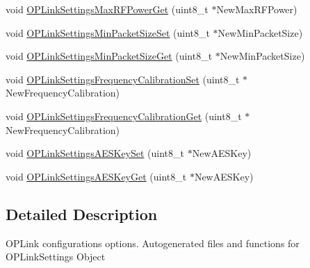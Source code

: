 \begin{DoxyCompactItemize}
\item 
void \hyperlink{group___o_p_link_settings_ga871cbb3c111d2d9a970a85e9e14ec7a9}{\-O\-P\-Link\-Settings\-Max\-R\-F\-Power\-Get} (uint8\-\_\-t $\ast$\-New\-Max\-R\-F\-Power)
\item 
void \hyperlink{group___o_p_link_settings_gafdf971b53771b6a2d7e8a5648ed29b06}{\-O\-P\-Link\-Settings\-Min\-Packet\-Size\-Set} (uint8\-\_\-t $\ast$\-New\-Min\-Packet\-Size)
\item 
void \hyperlink{group___o_p_link_settings_ga1ed89784471fb7d19d16321a8d79c16d}{\-O\-P\-Link\-Settings\-Min\-Packet\-Size\-Get} (uint8\-\_\-t $\ast$\-New\-Min\-Packet\-Size)
\item 
void \hyperlink{group___o_p_link_settings_gafded5b77178650bf25b7b37420744b00}{\-O\-P\-Link\-Settings\-Frequency\-Calibration\-Set} (uint8\-\_\-t $\ast$\-New\-Frequency\-Calibration)
\item 
void \hyperlink{group___o_p_link_settings_ga8cc9c06c0b18bb8e8c9f9ab22507281c}{\-O\-P\-Link\-Settings\-Frequency\-Calibration\-Get} (uint8\-\_\-t $\ast$\-New\-Frequency\-Calibration)
\item 
void \hyperlink{group___o_p_link_settings_ga91dc59f8f795fdf64dc45d5f27ec75fb}{\-O\-P\-Link\-Settings\-A\-E\-S\-Key\-Set} (uint8\-\_\-t $\ast$\-New\-A\-E\-S\-Key)
\item 
void \hyperlink{group___o_p_link_settings_ga0299c3a97ae21bc8e75069688cbe95fd}{\-O\-P\-Link\-Settings\-A\-E\-S\-Key\-Get} (uint8\-\_\-t $\ast$\-New\-A\-E\-S\-Key)
\end{DoxyCompactItemize}


\subsection{\-Detailed \-Description}
\-O\-P\-Link configurations options. \-Autogenerated files and functions for \-O\-P\-Link\-Settings \-Object 

